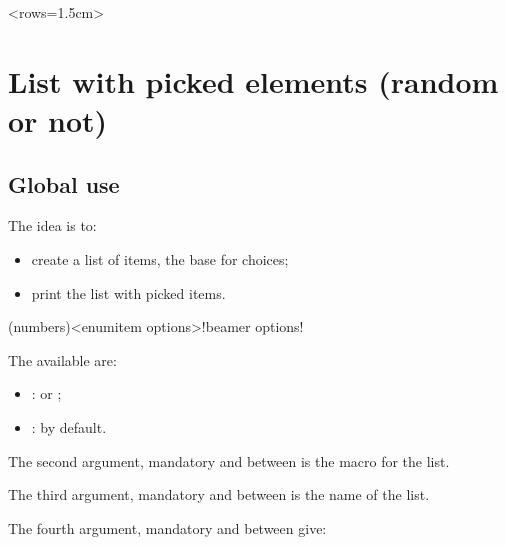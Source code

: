 \documentclass[english,11pt,a4paper]{article}
\begin{document}
\begin{demohigh}[language=latex/latex3,style/main=teal!25,style/code=teal!25]
    <rows={1.5cm}>
\end{demohigh}

\pagebreak

\section{List with picked elements (random or not)}

\subsection{Global use}

The idea is to:

\begin{itemize}
	\item create a list of items, the base for choices;
	\item print the list with picked items.
\end{itemize}

\begin{codehigh}[language=latex/latex3,style/main=teal!25,style/code=teal!25]
\end{codehigh}

\begin{codehigh}[language=latex/latex3,style/main=teal!25,style/code=teal!25]
(numbers)<enumitem options>!beamer options!
\end{codehigh}

The available  are:

\begin{itemize}
	\item {}:  or ;
	\item {}:  by default.
\end{itemize}

The second argument, mandatory and between  is the macro for the list.

The third argument, mandatory and between  is the name of the list.

The fourth argument, mandatory and between  give:
\end{document}
